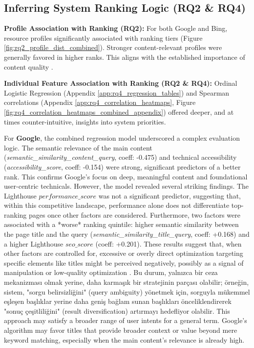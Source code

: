 \documentclass[a4paper,fleqn]{cas-sc}
\newcommand{\longvar}[1]{\textit{#1}}
\begin{document}
\subsection{Inferring System Ranking Logic (RQ2 \& RQ4)}
\label{subsec:discussion_rq2_rq4}
\textbf{Profile Association with Ranking (RQ2):} For both Google and Bing, resource profiles significantly associated with ranking tiers (Figure \ref{fig:rq2_profile_dist_combined}). Stronger content-relevant profiles were generally favored in higher ranks. This aligns with the established importance of content quality \citep{Srinivas2025}.

\textbf{Individual Feature Association with Ranking (RQ2 \& RQ4):} Ordinal Logistic Regression (Appendix \ref{app:rq4_regression_tables}) and Spearman correlations (Appendix \ref{app:rq4_correlation_heatmaps}, Figure \ref{fig:rq4_correlation_heatmaps_combined_appendix}) offered deeper, and at times counter-intuitive, insights into system priorities.

For \textbf{Google}, the combined regression model underscored a complex evaluation logic. The semantic relevance of the main content (\longvar{semantic_similarity_content_query}, coeff: -0.475) and technical accessibility (\longvar{accessibility_score}, coeff: -0.154) were strong, significant predictors of a better rank. This confirms Google's focus on deep, meaningful content and foundational user-centric technicals. However, the model revealed several striking findings. The Lighthouse $performance\_score$ was not a significant predictor, suggesting that, within this competitive landscape, performance alone does not differentiate top-ranking pages once other factors are considered. Furthermore, two factors were associated with a *worse* ranking quintile: higher semantic similarity between the page title and the query (\longvar{semantic_similarity_title_query}, coeff: +0.168) and a higher Lighthouse $seo\_score$ (coeff: +0.201). These results suggest that, when other factors are controlled for, excessive or overly direct optimization targeting specific elements like titles might be perceived negatively, possibly as a signal of manipulation or low-quality optimization \citep{Nagpal2021}. Bu durum, yalnızca bir ceza mekanizması olmak yerine, daha karmaşık bir stratejinin parçası olabilir; örneğin, sistem, "sorgu belirsizliğini" (query ambiguity) yönetmek için, sorguyla mükemmel eşleşen başlıklar yerine daha geniş bağlam sunan başlıkları önceliklendirerek "sonuç çeşitliliğini" (result diversification) artırmayı hedefliyor olabilir. This approach may satisfy a broader range of user intents for a general term. Google's algorithm may favor titles that provide broader context or value beyond mere keyword matching, especially when the main content's relevance is already high.
\end{document}
